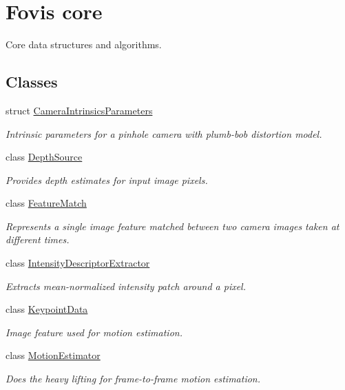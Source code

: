 \hypertarget{group__FovisCore}{
\section{Fovis core}
\label{group__FovisCore}
}


Core data structures and algorithms.  


\subsection*{Classes}
\begin{DoxyCompactItemize}
\item 
struct \hyperlink{structfovis_1_1CameraIntrinsicsParameters}{CameraIntrinsicsParameters}
\begin{DoxyCompactList}\small\item\em Intrinsic parameters for a pinhole camera with plumb-\/bob distortion model. \end{DoxyCompactList}\item 
class \hyperlink{classfovis_1_1DepthSource}{DepthSource}
\begin{DoxyCompactList}\small\item\em Provides depth estimates for input image pixels. \end{DoxyCompactList}\item 
class \hyperlink{classfovis_1_1FeatureMatch}{FeatureMatch}
\begin{DoxyCompactList}\small\item\em Represents a single image feature matched between two camera images taken at different times. \end{DoxyCompactList}\item 
class \hyperlink{classfovis_1_1IntensityDescriptorExtractor}{IntensityDescriptorExtractor}
\begin{DoxyCompactList}\small\item\em Extracts mean-\/normalized intensity patch around a pixel. \end{DoxyCompactList}\item 
class \hyperlink{classfovis_1_1KeypointData}{KeypointData}
\begin{DoxyCompactList}\small\item\em Image feature used for motion estimation. \end{DoxyCompactList}\item 
class \hyperlink{classfovis_1_1MotionEstimator}{MotionEstimator}
\begin{DoxyCompactList}\small\item\em Does the heavy lifting for frame-\/to-\/frame motion estimation. \end{DoxyCompactList}\item 

\end{DoxyCompactItemize}

